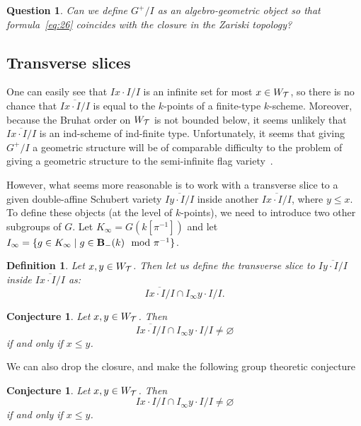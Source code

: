 \documentclass[10pt]{amsart}
\newtheorem{conj}[theo]{Conjecture}
\newtheorem{defi}[theo]{Definition}
\newtheorem{ques}[theo]{Question}
\begin{document}
\begin{ques}\label{ques:define-double-affine-flag-var}
Can we define $G^+/I$ as an algebro-geometric object so that formula~\eqref{eq:26} coincides with the closure in the Zariski topology?
\end{ques}

\subsection{Transverse slices}

One can easily see that $Ix \cdot I/I$ is an infinite set for most $x \in W_{\mathcal{T}}$, so there is no chance that $\overline{Ix \cdot I/I}$ is equal to the $k$-points of a finite-type $k$-scheme. Moreover, because the Bruhat order on $W_{\mathcal{T}}$ is not bounded below, it seems unlikely that $\overline{Ix \cdot I/I}$ is an ind-scheme of ind-finite type. Unfortunately, it seems that giving $G^+/I$ a geometric structure will be of comparable difficulty to the problem of giving a geometric structure to the semi-infinite flag variety~\cite{FM}.

However, what seems more reasonable is to work with a transverse slice to a given double-affine Schubert variety $\overline{I y \cdot I/I}$ inside another $\overline{I x\cdot I/I}$, where $y\leq x$. To define these objects (at the level of $k$-points), we need to introduce two other subgroups of $G$. Let $K_\infty = G(k[\pi^{-1}])$ and let $I_{\infty} = \{ g \in K_\infty \mid g \in \mathbf{B}_-(k) \mod \pi^{-1} \}$.

\begin{defi}
Let $x,y \in W_{\mathcal{T}}$. Then let us define the transverse slice to $\overline{I y \cdot I/I}$ inside $\overline{I x \cdot I/I}$ as:
\begin{equation}\label{eq:27}
\overline{I x \cdot I/I} \cap I_\infty y \cdot I/I.
\end{equation}
\end{defi}

\begin{conj}
Let $x,y \in W_{\mathcal{T}}$. Then
\begin{equation}\label{eq:28H}
\overline{I x \cdot I/I} \cap I_\infty y \cdot I/I \neq \varnothing
\end{equation}
if and only if $x \leq y$.
\end{conj}

We can also drop the closure, and make the following group theoretic conjecture
\begin{conj}
Let $x,y \in W_{\mathcal{T}}$. Then
\begin{equation}\label{eq:28}
I x \cdot I/I \cap I_\infty y \cdot I/I \neq \varnothing
\end{equation}
if and only if $x \leq y$.
\end{conj}
\end{document}

